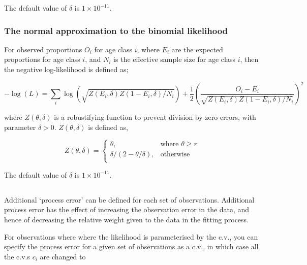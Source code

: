 The default value of $\delta$ is $1 \times 10^{-11}$.

\subsubsection*{The normal approximation to the binomial likelihood}

For observed proportions $O_i$ for age class $i$, where $E_i$ are the expected proportions for age class $i$, and $N_i$ is the effective sample size for age class $i$, then the negative log-likelihood is defined as;  

\begin{equation}
-\log \left(L \right)= \sum\limits_i \log \left( \sqrt{Z\left(E_i,\delta \right)Z\left(1-E_i,\delta\right)/N_i} \right)     + \frac{1}{2} \left( \frac{O_i-E_i}{\sqrt{Z\left(E_i,\delta\right)Z\left(1-E_i,\delta \right)/N_i}} \right)^2
\end{equation}

where $Z \left(\theta,\delta \right)$ is a robustifying function to prevent division by zero errors, with parameter $\delta>0$. $Z \left(\theta,\delta \right)$ is defined as,

\begin{equation}
Z \left(\theta,\delta \right) = \begin{cases}
\theta, & \text{where $\theta \ge r$} \\
\delta/\left( 2-\theta/\delta \right), & \text{otherwise} \\  
\end{cases}
\end{equation}

The default value of $\delta$ is $1 \times 10^{-11}$.

\subsection{}

Additional `process error' can be defined for each set of observations. Additional process error has the effect of increasing the observation error in the data, and hence of decreasing the relative weight given to the data in the fitting process. 

For observations where where the likelihood is parameterised by the c.v., you can specify the process error for a given set of observations as a c.v., in which case all the c.v.s $c_i$ are changed to

